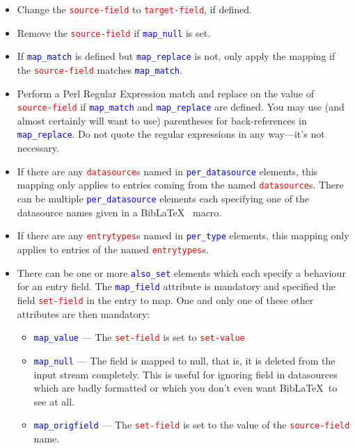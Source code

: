 \documentclass{ltxdockit}
\begin{document}
\begin{itemize}
\item Change the \textcolor{red}{\texttt{source-field}} to
  \textcolor{red}{\texttt{target-field}}, if defined.
\item Remove the \textcolor{red}{\texttt{source-field}} if
  \textcolor{blue}{\texttt{map\_null}} is set.
\item If \textcolor{blue}{\texttt{map\_match}} is defined but
  \textcolor{blue}{\texttt{map\_replace}} is not, only apply the
  mapping if the \textcolor{red}{\texttt{source-field}} matches
  \textcolor{blue}{\texttt{map\_match}}.
\item Perform a Perl Regular Expression match and replace on the value of
  \textcolor{red}{\texttt{source-field}} if
  \textcolor{blue}{\texttt{map\_match}} and
  \textcolor{blue}{\texttt{map\_replace}} are defined. You may use (and almost certainly
  will want to use) parentheses for back-references in \textcolor{blue}{\texttt{map\_replace}}.
  Do not quote the regular expressions in any way---it's not necessary.
\item If there are any \textcolor{red}{\texttt{datasource}}s named in
  \textcolor{blue}{\texttt{per\_datasource}} elements, this mapping only applies to entries
  coming from the named \textcolor{red}{\texttt{datasource}}s. There can be
  multiple \textcolor{blue}{\texttt{per\_datasource}} elements each specifying one of the
  datasource names given in a Bib\LaTeX\ \verb++ macro.
\item If there are any \textcolor{red}{\texttt{entrytypes}}s named in
  \textcolor{blue}{\texttt{per\_type}} elements, this mapping only applies to entries
  of the named \textcolor{red}{\texttt{entrytypes}}s.
\item There can be one or more \textcolor{blue}{\texttt{also\_set}} elements which each specify
  a behaviour for an entry field. The \textcolor{blue}{\texttt{map\_field}} attribute is
  mandatory and specified the field \textcolor{red}{\texttt{set-field}} in
  the entry to map. One and only one of these other attributes are then
  mandatory:
  \begin{itemize}
    \item \textcolor{blue}{\texttt{map\_value}} --- The
      \textcolor{red}{\texttt{set-field}} is set to
      \textcolor{red}{\texttt{set-value}}
    \item \textcolor{blue}{\texttt{map\_null}} --- The field is mapped to
      null, that is, it is deleted from the input stream completely. This
      is useful for ignoring field in datasources which are badly formatted
      or which you don't even want Bib\LaTeX\ to see at all.
      \item \textcolor{blue}{\texttt{map\_origfield}} --- The
        \textcolor{red}{\texttt{set-field}} is set to the value of the
        \linebreak\textcolor{red}{\texttt{source-field}} name.
  \end{itemize}
\end{itemize}
\end{document}
